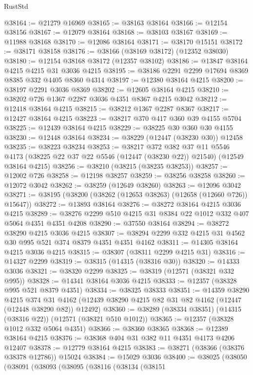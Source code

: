 \begin{lexlean}{RustStd}
\begin{coremodule}
@38164 := @21279 @16969
@38165 := @38163 @38164
@38166 := @12154 @38156
@38167 := @12079 @38164
@38168 := @38103 @38167
@38169 := @11988 @38168
@38170 := @12086 @38164
@38171 := @38170 @15151
@38172 := @38171 @38158
@38176 := @38166 (@38169 @38172) (@12352 @38030)
@38180 := @12154 @38168 @38172 (@12357 @38102)
@38186 := @13847 @38164 @4215 @4215 @31 @3036 @4215
@38195 := @38186 @2291 @2299 @17694 @8369 @8385 @332 @4405 @8360 @4314
@38197 := @12380 @38164 @4215
@38200 := @38197 @2291 @3036 @8369
@38202 := @12605 @38164 @4215
@38210 := @38202 @726 @1367 @2287 @3036 @4351 @8367 @4215 @3042
@38212 := @12418 @38164 @4215
@38215 := @38212 @1367 @2287 @8367
@38217 := @12427 @38164 @4215
@38223 := @38217 @370 @417 @360 @39 @4155 @5704
@38225 := @12439 @38164 @4215
@38229 := @38225 @30 @360 @30 @4155
@38230 := @12448 @38164
@38234 := @38229 (@12447 (@38230 @30)) @12458
@38235 := @38223 @38234
@38253 := @38217
    @372
    @382
    @37
    @11
    @5546
    @4173
    (@38225 @22 @37 @22 @5546 (@12447 (@38230 @22)) @21540)
    (@12549 @38164 @4215)
@38256 := @38210 (@38215 (@38235 @38253))
@38257 := @12002 @726
@38258 := @12198 @38257
@38259 := @38256 @38258
@38260 := @12072 @3042
@38262 := @38259 (@12649 @38260)
@38263 := @12096 @3042
@38271 := @38195 (@38200 (@38262 (@12653 @38263) (@12658 (@12660 @726)) @15647))
@38272 := @13893 @38164
@38276 := @38272 @38164 @4215 @3036 @4215
@38289 := @38276 @2299 @510 @4215 @31 @8384 @22 @1012 @332 @407 @5064 @4351 @4351 @4208
@38290 := @37550 @38164
@38294 := @38272 @38290 @4215 @3036 @4215
@38307 := @38294 @2299 @332 @4215 @31 @4562 @30 @995 @521 @374 @8379 @4351 @4351 @4162
@38311 := @14305 @38164 @4215 @3036 @4215
@38315 := @38307 (@38311 @2299 @4215 @31)
@38316 := @14327 @2299
@38319 := @38315 (@14315 (@38316 @30))
@38320 := @14333 @3036
@38321 := @38320 @2299
@38325 := @38319 (@12571 (@38321 @332 @995))
@38328 := @14341 @38164 @3036 @4215
@38333 := @12357 (@38328 @995 @521 @8379 @4351)
@38334 := @38325 @38333
@38351 := @14359
    @38290
    @4215
    @374
    @31
    @4162
    (@12439 @38290 @4215 @82 @31 @82 @4162 (@12447 (@12448 @38290 @82)) @12492)
@38360 := @38289 (@38334 @38351) (@14315 (@38316 @22)) (@12571 (@38321 @510 @1012))
@38365 := @12357 (@38328 @1012 @332 @5064 @4351)
@38366 := @38360 @38365
@38368 := @12389 @38164 @4215
@38376 := @38368 @404 @31 @382 @11 @4351 @4173 @4206 @12407
@38378 := @12779 @38164 @4215
@38383 := @38271 (@38366 (@38376 @38378 @12786)) @15024
@38384 := @15029 @3036
@38400 := @38025
    (@38050
      (@38091
        (@38093
          (@38095
            (@38116
              (@38134
                (@38151

\end{coremodule}
\end{lexlean}
